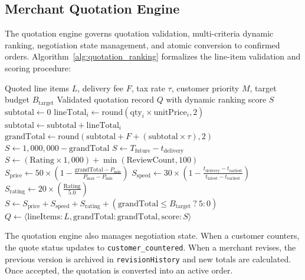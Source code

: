 \subsection{Merchant Quotation Engine}
The quotation engine governs quotation validation, multi-criteria dynamic ranking, negotiation state management, and atomic conversion to confirmed orders. Algorithm~\ref{alg:quotation_ranking} formalizes the line-item validation and scoring procedure:

\begin{algorithm}[H]
\caption{Itemized Quotation Validation and Multi-Criteria Dynamic Ranking}
\label{alg:quotation_ranking}
\begin{algorithmic}[1]
\Require Quoted line items $L$, delivery fee $F$, tax rate $\tau$, customer priority $M$, target budget $B_{\text{target}}$
\Ensure Validated quotation record $Q$ with dynamic ranking score $S$
\State $\text{subtotal} \gets 0$
    \State $\text{lineTotal}_i \gets \text{round}(\text{qty}_i \times \text{unitPrice}_i, 2)$
    \State $\text{subtotal} \gets \text{subtotal} + \text{lineTotal}_i$
\EndFor
\State $\text{grandTotal} \gets \text{round}(\text{subtotal} + F + (\text{subtotal} \times \tau), 2)$
    \State $S \gets 1{,}000{,}000 - \text{grandTotal}$
    \State $S \gets T_{\text{future}} - t_{\text{delivery}}$
    \State $S \gets (\text{Rating} \times 1{,}000) + \min(\text{ReviewCount}, 100)$
    \State $S_{\text{price}} \gets 50 \times \left(1 - \frac{\text{grandTotal} - P_{\min}}{P_{\max} - P_{\min}}\right)$
    \State $S_{\text{speed}} \gets 30 \times \left(1 - \frac{t_{\text{delivery}} - t_{\text{earliest}}}{t_{\text{latest}} - t_{\text{earliest}}}\right)$
    \State $S_{\text{rating}} \gets 20 \times \left(\frac{\text{Rating}}{5.0}\right)$
    \State $S \gets S_{\text{price}} + S_{\text{speed}} + S_{\text{rating}} + (\text{grandTotal} \le B_{\text{target}} \ ? \ 5 : 0)$
\EndIf
\State \Return $Q \gets \langle \text{lineItems}: L, \text{grandTotal}: \text{grandTotal}, \text{score}: S \rangle$
\end{algorithmic}
\end{algorithm}

The quotation engine also manages negotiation state. When a customer counters, the quote status updates to \texttt{customer\_countered}. When a merchant revises, the previous version is archived in \texttt{revisionHistory} and new totals are calculated. Once accepted, the quotation is converted into an active order.

